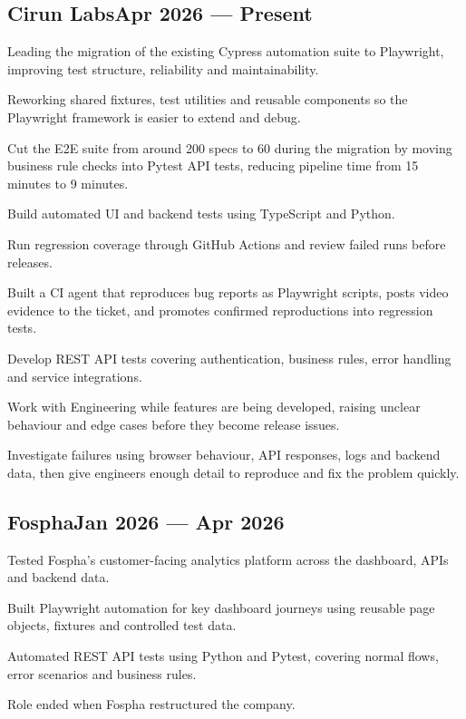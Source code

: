 \subsection{{Cirun Labs\hfill Apr 2026 --- Present}}
\begin{zitemize}
  \item Leading the migration of the existing Cypress automation suite to Playwright, improving test structure, reliability and maintainability.
  \item Reworking shared fixtures, test utilities and reusable components so the Playwright framework is easier to extend and debug.
  \item Cut the E2E suite from around 200 specs to 60 during the migration by moving business rule checks into Pytest API tests, reducing pipeline time from 15 minutes to 9 minutes.
  \item Build automated UI and backend tests using TypeScript and Python.
  \item Run regression coverage through GitHub Actions and review failed runs before releases.
  \item Built a CI agent that reproduces bug reports as Playwright scripts, posts video evidence to the ticket, and promotes confirmed reproductions into regression tests.
  \item Develop REST API tests covering authentication, business rules, error handling and service integrations.
  \item Work with Engineering while features are being developed, raising unclear behaviour and edge cases before they become release issues.
  \item Investigate failures using browser behaviour, API responses, logs and backend data, then give engineers enough detail to reproduce and fix the problem quickly.
\end{zitemize}

\subsection{{Fospha\hfill Jan 2026 --- Apr 2026}}
\begin{zitemize}
  \item Tested Fospha's customer-facing analytics platform across the dashboard, APIs and backend data.
  \item Built Playwright automation for key dashboard journeys using reusable page objects, fixtures and controlled test data.
  \item Automated REST API tests using Python and Pytest, covering normal flows, error scenarios and business rules.
  \item Role ended when Fospha restructured the company.
\end{zitemize}

